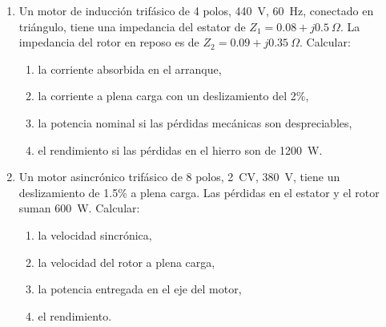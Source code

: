 \documentclass[../main]{subfiles}
\begin{document}
\begin{enumerate}
\begin{enumerate}
      \item la potencia útil en el eje del motor,
      \item el rendimiento,
      \item el par desarrollado.
    \end{enumerate}
  \item Un motor de inducción trifásico de 4 polos, \qty{440}{V}, \qty{60}{Hz}, conectado en triángulo, tiene una impedancia del estator de $Z_1 = 0.08 + j0.5~\Omega$. La impedancia del rotor en reposo es de $Z_2 = 0.09 + j0.35~\Omega$. Calcular:
    \begin{enumerate}
      \item la corriente absorbida en el arranque,
      \item la corriente a plena carga con un deslizamiento del 2\%,
      \item la potencia nominal si las pérdidas mecánicas son despreciables,
      \item el rendimiento si las pérdidas en el hierro son de \qty{1200}{W}.
    \end{enumerate}
  \item Un motor asincrónico trifásico de 8 polos, \qty{2}{CV}, \qty{380}{V}, tiene un deslizamiento de 1.5\% a plena carga. Las pérdidas en el estator y el rotor suman \qty{600}{W}. Calcular:
    \begin{enumerate}
      \item la velocidad sincrónica,
      \item la velocidad del rotor a plena carga,
      \item la potencia entregada en el eje del motor,
      \item el rendimiento.
    \end{enumerate}
\end{enumerate}
\end{document}
